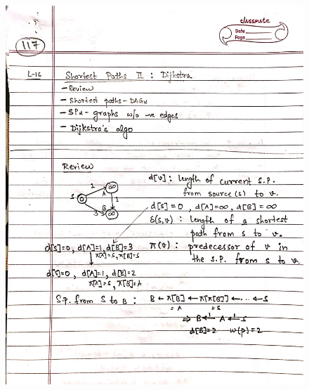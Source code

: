 \begin{figure}[H]
    \centering
    \includegraphics[scale=0.25]{"./MIT-6.006/MIT-6006-117"}
\end{figure}
\newpage
